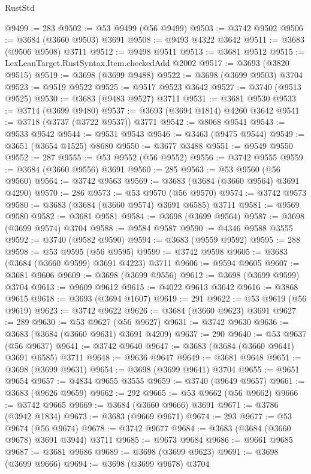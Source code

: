 \begin{lexlean}{RustStd}
\begin{coremodule}
{\begin{coremodule}
{{{{{{{{{{{{{{{{{{{{{{{{{{{{{{{{{{{{{{{{{{{{{{{@9499 := 283
@9502 := @53 @9499 (@56 @9499)
@9503 := @3742 @9502
@9506 := @3684 (@3660 @9503) @3691
@9508 := @9493 @4322 @3642
@9511 := @3683 (@9506 @9508) @3711
@9512 := @9498 @9511
@9513 := @3681 @9512
@9515 := LexLeanTarget.RustSyntax.Item.checkedAdd @2002
@9517 := @3693 (@3820 @9515)
@9519 := @3698 (@3699 @9488)
@9522 := @3698 (@3699 @9503) @3704
@9523 := @9519 @9522
@9525 := @9517 @9523 @3642
@9527 := @3740 (@9513 @9525)
@9530 := @3683 (@9483 @9527) @3711
@9531 := @3681 @9530
@9533 := @3714 (@3699 @9480)
@9537 := @3693 (@3694 @1814) @4260 @3642
@9541 := @3718 (@3737 (@3722 @9537)) @3771
@9542 := @8068 @9541
@9543 := @9533 @9542
@9544 := @9531 @9543
@9546 := @3463 (@9475 @9544)
@9549 := @3651 (@3654 @1525) @8680
@9550 := @3677 @3488
@9551 := @9549 @9550
@9552 := 287
@9555 := @53 @9552 (@56 @9552)
@9556 := @3742 @9555
@9559 := @3684 (@3660 @9556) @3691
@9560 := 285
@9563 := @53 @9560 (@56 @9560)
@9564 := @3742 @9563
@9569 := @3683 (@3684 (@3660 @9564) @3691 @4290)
@9570 := 286
@9573 := @53 @9570 (@56 @9570)
@9574 := @3742 @9573
@9580 := @3683 (@3684 (@3660 @9574) @3691 @6585) @3711
@9581 := @9569 @9580
@9582 := @3681 @9581
@9584 := @3698 (@3699 @9564)
@9587 := @3698 (@3699 @9574) @3704
@9588 := @9584 @9587
@9590 := @4346 @9588 @3555
@9592 := @3740 (@9582 @9590)
@9594 := @3683 (@9559 @9592)
@9595 := 288
@9598 := @53 @9595 (@56 @9595)
@9599 := @3742 @9598
@9605 := @3683 (@3684 (@3660 @9599) @3691 @4223) @3711
@9606 := @9594 @9605
@9607 := @3681 @9606
@9609 := @3698 (@3699 @9556)
@9612 := @3698 (@3699 @9599) @3704
@9613 := @9609 @9612
@9615 := @4022 @9613 @3642
@9616 := @3868 @9615
@9618 := @3693 (@3694 @1607)
@9619 := 291
@9622 := @53 @9619 (@56 @9619)
@9623 := @3742 @9622
@9626 := @3684 (@3660 @9623) @3691
@9627 := 289
@9630 := @53 @9627 (@56 @9627)
@9631 := @3742 @9630
@9636 := @3683 (@3684 (@3660 @9631) @3691 @4209)
@9637 := 290
@9640 := @53 @9637 (@56 @9637)
@9641 := @3742 @9640
@9647 := @3683 (@3684 (@3660 @9641) @3691 @6585) @3711
@9648 := @9636 @9647
@9649 := @3681 @9648
@9651 := @3698 (@3699 @9631)
@9654 := @3698 (@3699 @9641) @3704
@9655 := @9651 @9654
@9657 := @4834 @9655 @3555
@9659 := @3740 (@9649 @9657)
@9661 := @3683 (@9626 @9659)
@9662 := 292
@9665 := @53 @9662 (@56 @9662)
@9666 := @3742 @9665
@9669 := @3684 (@3660 @9666) @3691
@9671 := @3786 (@3942 @1834)
@9673 := @3683 (@9669 @9671)
@9674 := 293
@9677 := @53 @9674 (@56 @9674)
@9678 := @3742 @9677
@9684 := @3683 (@3684 (@3660 @9678) @3691 @3944) @3711
@9685 := @9673 @9684
@9686 := @9661 @9685
@9687 := @3681 @9686
@9689 := @3698 (@3699 @9623)
@9691 := @3698 (@3699 @9666)
@9694 := @3698 (@3699 @9678) @3704
}}}}}}}}}}}}}}}}}}}}}}}}}}}}}}}}}}}}}}}}}}}}}}}
\end{coremodule}}
\end{coremodule}
\end{lexlean}
